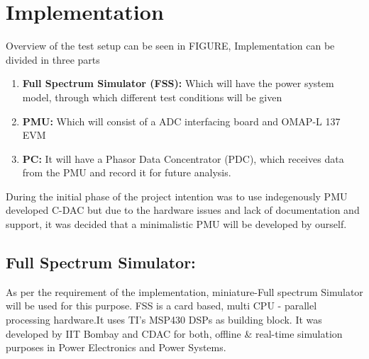 \section{Implementation}
Overview of the test setup can be seen in FIGURE, Implementation can be divided in three parts
\begin{enumerate}
\item \textbf{Full Spectrum Simulator (FSS):} Which will have the power system model, through which different test conditions will be given
\item \textbf{PMU:} Which will consist of a ADC interfacing board and OMAP-L 137 EVM
\item \textbf{PC:} It will have a Phasor Data Concentrator (PDC), which receives data from the PMU and record it for future analysis.
\end{enumerate}
During the initial phase of the project intention was to use indegenously PMU developed C-DAC but due to the hardware issues and lack of documentation and support, it was decided that a minimalistic PMU will be developed by ourself.

\subsection{Full Spectrum Simulator:}
As per the requirement of the implementation, miniature-Full spectrum Simulator will be used for this purpose. FSS is a card based, multi CPU - parallel processing hardware.It uses TI's MSP430 DSPs as building block. It was developed by IIT Bombay and CDAC for both, offline \& real-time  simulation purposes in Power Electronics and Power Systems.

